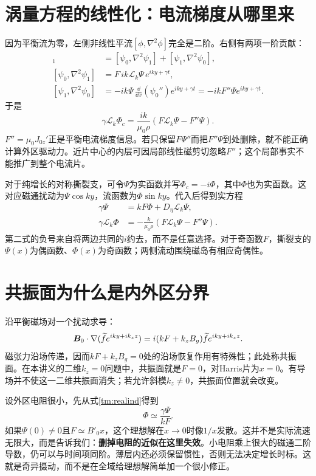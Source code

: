 \section{涡量方程的线性化：电流梯度从哪里来}
因为平衡流为零，左侧非线性平流$[\phi,\nabla^2\phi]$完全是二阶。右侧有两项一阶贡献：
\begin{align}
 [\psi,\nabla^2\psi]_1
 &=[\psi_0,\nabla^2\psi_1]+[\psi_1,\nabla^2\psi_0],\\
 [\psi_0,\nabla^2\psi_1]&=F\,ik\mathcal L_k\Psi\,e^{iky+\gamma t},\\
 [\psi_1,\nabla^2\psi_0]&=-ik\Psi\,\frac{\dd}{\dd x}(\psi_0'')e^{iky+\gamma t}
 =-ikF''\Psi e^{iky+\gamma t}.
\end{align}
于是
\begin{equation}
 \boxed{\gamma\mathcal L_k\Phi_c
 =\frac{ik}{\mu_0\rho}\left(F\mathcal L_k\Psi-F''\Psi\right).}
 \label{tm:linvort}
\end{equation}
$F''=\mu_0J_{0z}'$正是平衡电流梯度信息。若只保留$F\Psi''$而把$F''\Psi$到处删除，就不能正确计算外区驱动力。近片中心的内层可因局部线性磁剪切忽略$F''$；这个局部事实不能推广到整个电流片。

对于纯增长的对称撕裂支，可令$\Psi$为实函数并写$\Phi_c=-i\Phi$，其中$\Phi$也为实函数。这对应磁通扰动为$\Psi\cos ky$，流函数为$\Phi\sin ky$。代入后得到实方程
\begin{align}
 \gamma\Psi&=kF\Phi+D_\eta\mathcal L_k\Psi,\label{tm:realind}\\
 \gamma\mathcal L_k\Phi&=-\frac{k}{\mu_0\rho}
 \left(F\mathcal L_k\Psi-F''\Psi\right).
 \label{tm:realvort}
\end{align}
第二式的负号来自将两边共同的$i$约去，而不是任意选择。对于奇函数$F$，撕裂支的$\Psi(x)$为偶函数、$\Phi(x)$为奇函数；两侧流动围绕磁岛有相应奇偶性。

\section{共振面为什么是内外区分界}
沿平衡磁场对一个扰动求导：
\begin{equation}
 \bm{B}_0\cdot\nabla(\widetilde f e^{iky+ik_zz})
 =i(kF+k_zB_g)\widetilde f e^{iky+ik_zz}.
\end{equation}
磁张力沿场传递，因而$kF+k_zB_g=0$处的沿场恢复作用有特殊性；此处称共振面。在本讲义的二维$k_z=0$问题中，共振面就是$F=0$，对Harris片为$x=0$。有导场并不使这一二维共振面消失；若允许斜模$k_z\ne0$，共振面位置就会改变。

设外区电阻很小，先从式\eqref{tm:realind}得到
\begin{equation}
 \Phi\simeq\frac{\gamma\Psi}{kF}.
 \label{tm:idealflow}
\end{equation}
如果$\Psi(0)\ne0$且$F\simeq B'_0x$，这个理想解在$x\to0$时像$1/x$发散。这并不是实际流速无限大，而是告诉我们：\textbf{删掉电阻的近似在这里失效}。小电阻乘上很大的磁通二阶导数，仍可以与时间项同阶。薄层内还必须保留惯性，否则无法决定增长时标。这就是奇异摄动，而不是在全域给理想解简单加一个很小修正。

